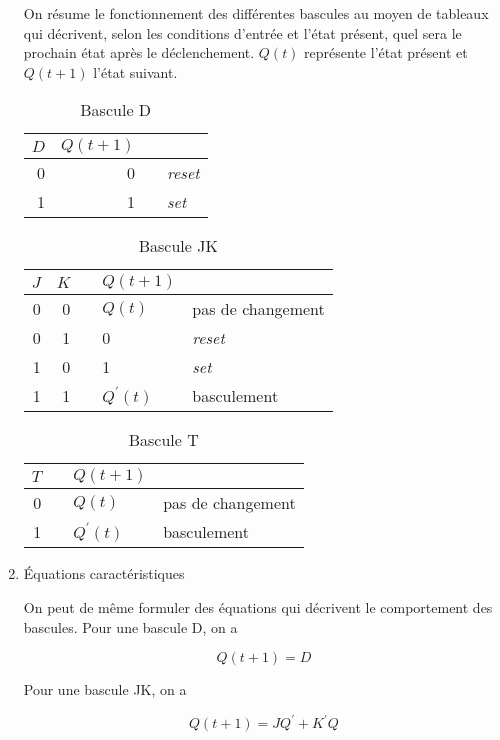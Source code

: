 \documentclass[letter, oneside]{book}
\begin{document}
\begin{enumerate}
On résume le fonctionnement des différentes bascules au moyen de
tableaux qui décrivent, selon les conditions d'entrée et l'état
présent, quel sera le prochain état après le déclenchement. \(Q(t)\)
représente l'état présent et \(Q(t+1)\) l'état suivant.

\begin{table}[htbp]
\caption{\label{tab:orgcb7bf8f}Bascule D}
\centering
\begin{tabular}{rrll}
\(D\) & \(Q(t+1)\) &  & \\[0pt]
\hline
0 & 0 &  & \emph{reset}\\[0pt]
1 & 1 &  & \emph{set}\\[0pt]
\end{tabular}
\end{table}

\begin{table}[htbp]
\caption{\label{tab:org427cf86}Bascule JK}
\centering
\begin{tabular}{rrlll}
\(J\) & \(K\) &  & \(Q(t+1)\) & \\[0pt]
\hline
0 & 0 &  & \(Q(t)\) & pas de changement\\[0pt]
0 & 1 &  & 0 & \emph{reset}\\[0pt]
1 & 0 &  & 1 & \emph{set}\\[0pt]
1 & 1 &  & \(Q^\prime(t)\) & basculement\\[0pt]
\end{tabular}
\end{table}

\begin{table}[htbp]
\caption{\label{tab:org6ddfb69}Bascule T}
\centering
\begin{tabular}{rlll}
\(T\) &  & \(Q(t+1)\) & \\[0pt]
\hline
0 &  & \(Q(t)\) & pas de changement\\[0pt]
1 &  & \(Q^\prime(t)\) & basculement\\[0pt]
\end{tabular}
\end{table}

\item Équations caractéristiques
\label{sec:orgc6b1734}

On peut de même formuler des équations qui décrivent le comportement
des bascules. Pour une bascule D, on a

$$Q(t+1) = D$$

Pour une bascule JK, on a

$$Q(t+1) =J Q^\prime + K^\prime Q$$


\end{enumerate}
\end{document}
